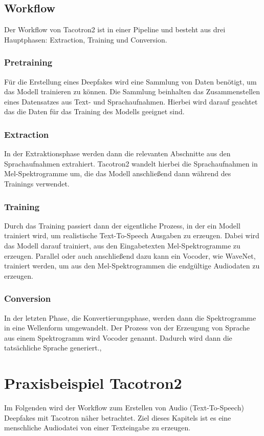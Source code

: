 \subsection{Workflow}
Der Workflow von Tacotron2 ist in einer Pipeline und besteht aus drei Hauptphasen: Extraction, Training und Conversion.
\subsubsection*{Pretraining}
Für die Erstellung eines Deepfakes wird eine Sammlung von Daten benötigt, um das Modell trainieren zu können. Die Sammlung beinhalten das Zusammenstellen eines Datensatzes aus Text- und Sprachaufnahmen. Hierbei wird darauf geachtet das die Daten für das Training des Modells geeignet sind.\cite{Arxiv}
\subsubsection*{Extraction}
In der Extraktionsphase werden dann die relevanten Abschnitte aus den Sprachaufnahmen extrahiert. Tacotron2 wandelt hierbei die Sprachaufnahmen in Mel-Spektrogramme um, die das Modell anschließend dann während des Trainings verwendet.\cite{Arxiv}
\subsubsection*{Training}
Durch das Training passiert dann der eigentliche Prozess, in der ein Modell trainiert wird, um realistische Text-To-Speech Ausgaben zu erzeugen. Dabei wird das Modell darauf trainiert, aus den Eingabetexten Mel-Spektrogramme zu erzeugen. Parallel oder auch anschließend dazu kann ein Vocoder, wie WaveNet, trainiert werden, um aus den Mel-Spektrogrammen die endgültige Audiodaten zu erzeugen.\cite{Arxiv}
\subsubsection*{Conversion}
In der letzten Phase, die Konvertierungsphase, werden dann die Spektrogramme in eine Wellenform umgewandelt. Der Prozess von der Erzeugung von Sprache aus einem Spektrogramm wird Vocoder genannt. Dadurch wird dann die tatsächliche Sprache generiert.\cite{Arxiv},\cite{pytorch}
\section{Praxisbeispiel Tacotron2}
Im Folgenden wird der Workflow zum Erstellen von Audio (Text-To-Speech) Deepfakes mit Tacotron näher betrachtet. Ziel dieses Kapitels ist es eine menschliche Audiodatei von einer Texteingabe zu erzeugen.
